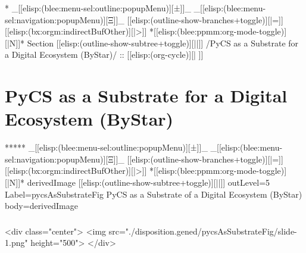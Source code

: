 \begin{whenOrg}
*  _[[elisp:(blee:menu-sel:outline:popupMenu)][±]]_ _[[elisp:(blee:menu-sel:navigation:popupMenu)][Ξ]]_ [[elisp:(outline-show-branches+toggle)][|=]] [[elisp:(bx:orgm:indirectBufOther)][|>]] *[[elisp:(blee:ppmm:org-mode-toggle)][|N]]*  Section    [[elisp:(outline-show-subtree+toggle)][||]]   /PyCS as a Substrate for a Digital Ecosystem (ByStar)/ ::  [[elisp:(org-cycle)][| ]]
\end{whenOrg}

\section{PyCS as a Substrate for a Digital Ecosystem (ByStar)}

\begin{whenOrg}
*****  _[[elisp:(blee:menu-sel:outline:popupMenu)][±]]_ _[[elisp:(blee:menu-sel:navigation:popupMenu)][Ξ]]_ [[elisp:(outline-show-branches+toggle)][|=]] [[elisp:(bx:orgm:indirectBufOther)][|>]] *[[elisp:(blee:ppmm:org-mode-toggle)][|N]]*  derivedImage [[elisp:(outline-show-subtree+toggle)][||]] outLevel=5 Label=pycsAsSubstrateFig PyCS as a Substrate of a Digital Ecosystem (ByStar) body=derivedImage

\end{whenOrg}

\begin{htmlonly}

\begin{frame}[fragile,plain,label=pycsAsSubstrateFig]
    \frametitle{}
    \framesubtitle{}
    \begin{rawhtml}
<div class="center">
<img src="./disposition.gened/pycsAsSubstrateFig/slide-1.png" height="500">
</div>
    \end{rawhtml}
\end{frame}
\end{htmlonly}

